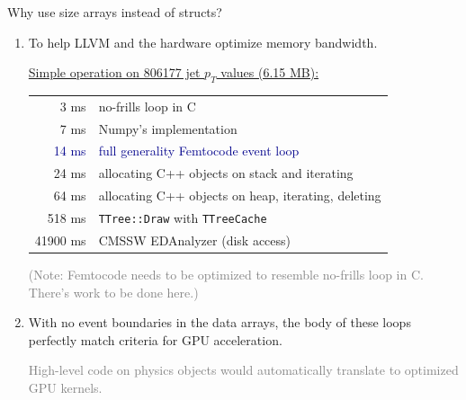 \documentclass{beamer}
\begin{document}
\begin{frame}{Why use size arrays instead of structs?}
\vspace{0.4 cm}
\begin{enumerate}\setlength{\itemsep}{0.2 cm}
\item To help LLVM and the hardware optimize memory bandwidth.

\vspace{0.2 cm}
\underline{Simple operation on 806177 jet $p_T$ values (6.15 MB):}

\vspace{-0.4 cm}
\begin{center}
\begin{tabular}{r l}
3 ms & no-frills loop in C \\
7 ms & Numpy's implementation \\
\textcolor{darkblue}{14 ms} & \textcolor{darkblue}{full generality Femtocode event loop} \\
24 ms & allocating C++ objects on stack and iterating \\
64 ms & allocating C++ objects on heap, iterating, deleting \\
518 ms & {\tt TTree::Draw} with {\tt TTreeCache} \\
41900 ms & CMSSW EDAnalyzer (disk access)
\end{tabular}
\end{center}

\textcolor{gray}{(Note: Femtocode needs to be optimized to resemble no-frills loop in C. There's work to be done here.)}

\item<2-> With no event boundaries in the data arrays, the body of these loops perfectly match criteria for GPU acceleration.

\vspace{0.1 cm}
\textcolor{gray}{High-level code on physics objects would automatically translate to optimized GPU kernels.}
\end{enumerate}
\end{frame}






\end{document}
